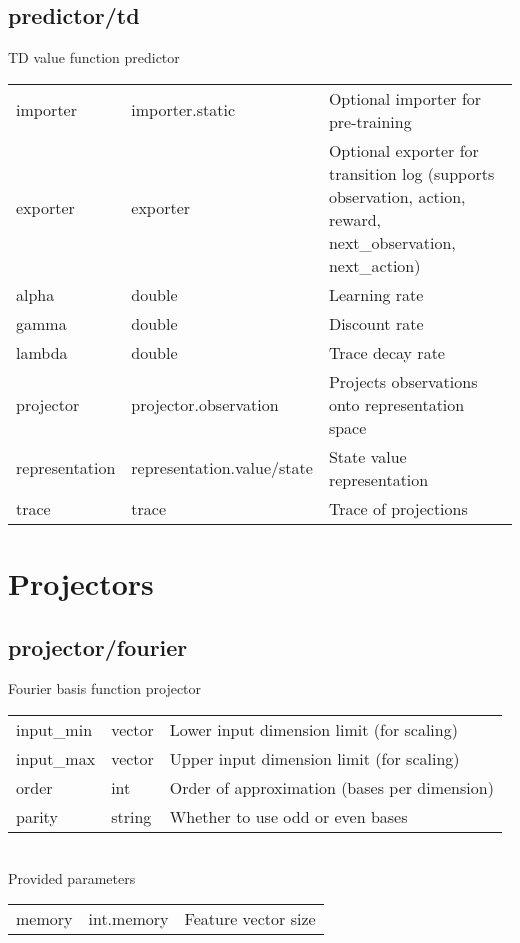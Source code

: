 \subsection{predictor/td}
\noindent TD value function predictor\\

\noindent\begin{tabular}{@{}lll@{}}
importer&importer.static&Optional importer for pre-training\\
exporter&exporter&Optional exporter for transition log (supports observation, action, reward, next\_observation, next\_action)\\
alpha&double&Learning rate\\
gamma&double&Discount rate\\
lambda&double&Trace decay rate\\
projector&projector.observation&Projects observations onto representation space\\
representation&representation.value/state&State value representation\\
trace&trace&Trace of projections\\
\end{tabular}
\section{Projectors}
\subsection{projector/fourier}
\noindent Fourier basis function projector\\

\noindent\begin{tabular}{@{}lll@{}}
input\_min&vector&Lower input dimension limit (for scaling)\\
input\_max&vector&Upper input dimension limit (for scaling)\\
order&int&Order of approximation (bases per dimension)\\
parity&string&Whether to use odd or even bases\\
\end{tabular}
\\

\noindent Provided parameters\\

\noindent\begin{tabular}{@{}lll@{}}
memory&int.memory&Feature vector size\\
\end{tabular}
